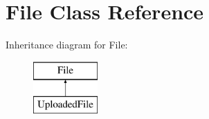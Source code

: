 \hypertarget{class_symfony_1_1_component_1_1_http_foundation_1_1_file_1_1_file}{
\section{\-File \-Class \-Reference}
\label{class_symfony_1_1_component_1_1_http_foundation_1_1_file_1_1_file}
}
\-Inheritance diagram for \-File\-:\begin{figure}[H]
\begin{center}
\leavevmode
\includegraphics[height=2.000000cm]{class_symfony_1_1_component_1_1_http_foundation_1_1_file_1_1_file}
\end{center}
\end{figure}
